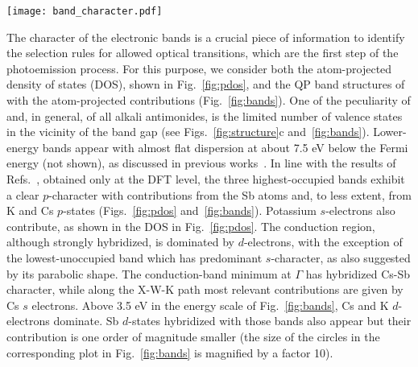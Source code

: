 \documentclass[aps,pra,superscriptaddress,twocolumn]{revtex4}
\begin{document}
%
\begin{figure*}
\center
\texttt{[image: band\_character.pdf]}
\caption{Band structure plots of , including the QP correction as a rigid shift, showing the atom-projected character of the valence and conduction bands, quantified by the size of the colored circles. The contributions of Sb $d$-states are magnified by a factor 10 compared to all the others.}
\label{fig:bands}
\end{figure*} 
%
The character of the electronic bands is a crucial piece of information to identify the selection rules for allowed optical transitions, which are the first step of the photoemission process. 
For this purpose, we consider both the atom-projected density of states (DOS), shown in Fig.~\ref{fig:pdos}, and the QP band structures of  with the atom-projected contributions (Fig.~\ref{fig:bands}).
One of the peculiarity of  and, in general, of all alkali antimonides, is the limited number of valence states in the vicinity of the band gap (see Figs.~\ref{fig:structure}c and~\ref{fig:bands}).
Lower-energy bands appear with almost flat dispersion at about 7.5 eV below the Fermi energy (not shown), as discussed in previous works~\cite{ette-degr02prb,kala+10jpcs,murt+16bms}. 
In line with the results of Refs.~\cite{ette-degr02prb,kala+10jpcs,murt+16bms}, obtained only at the DFT level, the three highest-occupied bands exhibit a clear $p$-character with contributions from the Sb atoms and, to less extent, from K and Cs $p$-states (Figs.~\ref{fig:pdos} and~\ref{fig:bands}). 
Potassium $s$-electrons also contribute, as shown in the DOS in Fig.~\ref{fig:pdos}.
The conduction region, although strongly hybridized, is dominated by $d$-electrons, with the exception of the lowest-unoccupied band which has predominant $s$-character, as also suggested by its parabolic shape.
The conduction-band minimum at $\Gamma$ has hybridized Cs-Sb character, while along the X-W-K path most relevant contributions are given by Cs $s$ electrons.
Above 3.5 eV in the energy scale of Fig.~\ref{fig:bands}, Cs and K $d$-electrons dominate.
Sb $d$-states hybridized with those bands also appear but their contribution is one order of magnitude smaller (the size of the circles in the corresponding plot in Fig.~\ref{fig:bands} is magnified by a factor 10).

\end{document}
